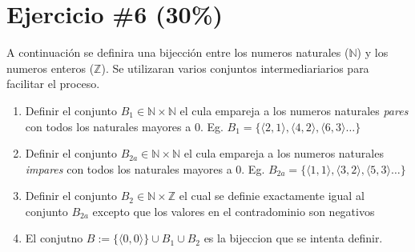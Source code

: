 \documentclass{article}
\begin{document}
\section*{Ejercicio \#6 (30\%)}
A continuaci\'on se definira una bijecci\'on entre los numeros naturales ($\mathbb{N}$) y los
numeros enteros ($\mathbb{Z}$). Se utilizaran varios conjuntos intermediariarios para facilitar
el proceso.
\begin{enumerate}
        \item{Definir el conjunto $B_1\in \mathbb{N}\times\mathbb{N}$ el cula empareja a los
        numeros naturales \emph{pares} con todos los naturales mayores a $0$. Eg. $B_1=\{
        \langle 2,1 \rangle, \langle 4,2 \rangle, \langle 6, 3 \rangle\ldots \}$}
        \item{Definir el conjunto $B_{2a}\in \mathbb{N}\times\mathbb{N}$ el cula empareja a los
        numeros naturales \emph{impares} con todos los naturales mayores a $0$. Eg. $B_{2a}=\{
        \langle 1,1 \rangle, \langle 3,2 \rangle, \langle 5, 3 \rangle\ldots \}$}
        \item{Definir el conjunto $B_{2}\in \mathbb{N}\times\mathbb{Z}$ el cual se definie
        exactamente igual al conjunto $B_{2a}$ excepto que los valores en el contradominio
        son negativos}
        \item{El conjutno $B:= \{\langle 0,0\rangle \}\cup B_{1} \cup B_{2}$ es la bijeccion
        que se intenta definir.}
\end{enumerate}

% 
% 
\end{document}
